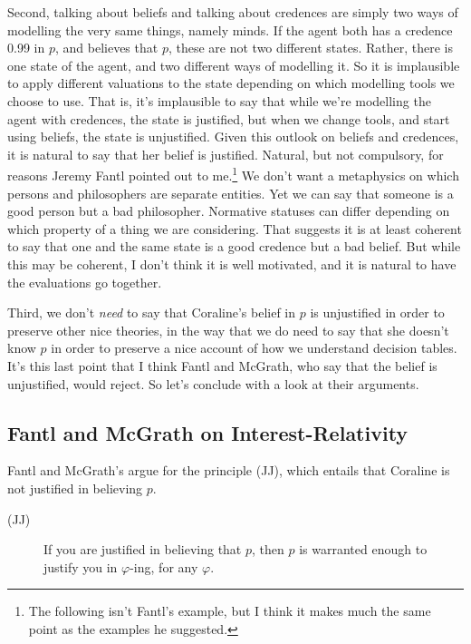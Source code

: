 Second, talking about beliefs and talking about credences are simply two ways of modelling the very same things, namely minds. If the agent both has a credence 0.99 in \(p\), and believes that \(p\), these are not two different states. Rather, there is one state of the agent, and two different ways of modelling it. So it is implausible to apply different valuations to the state depending on which modelling tools we choose to use. That is, it's implausible to say that while we're modelling the agent with credences, the state is justified, but when we change tools, and start using beliefs, the state is unjustified. Given this outlook on beliefs and credences, it is natural to say that her belief is justified. Natural, but not compulsory, for reasons Jeremy Fantl pointed out to me.\footnote{The following isn't Fantl's example, but I think it makes much the same point as the examples he suggested.} We don't want a metaphysics on which persons and philosophers are separate entities. Yet we can say that someone is a good person but a bad philosopher. Normative statuses can differ depending on which property of a thing we are considering. That suggests it is at least coherent to say that one and the same state is a good credence but a bad belief. But while this may be coherent, I don't think it is well motivated, and it is natural to have the evaluations go together.

Third, we don't \textit{need} to say that Coraline's belief in $p$ is unjustified in order to preserve other nice theories, in the way that we do need to say that she doesn't know $p$ in order to preserve a nice account of how we understand decision tables. It's this last point that I think Fantl and McGrath, who say that the belief is unjustified, would reject. So let's conclude with a look at their arguments.

\subsection{Fantl and McGrath on Interest-Relativity}

Fantl and McGrath's argue for the principle (JJ), which entails that Coraline is not justified in believing $p$.

\begin{description}
\item[(JJ)] If you are justified in believing that \(p\), then \(p\) is warranted enough to justify you in \(\varphi\)-ing, for any \(\varphi\). \cite[99]{FantlMcGrath2009}
\end{description}

